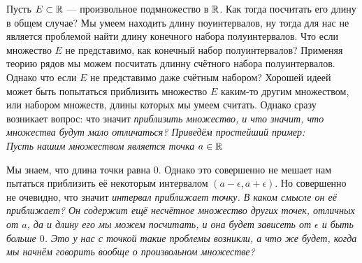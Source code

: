 Пусть $E \subset \mathbb{R}$ --- произвольное подмножество в $\mathbb{R}$. Как тогда посчитать его длину в общем случае?
Мы умеем находить длину поуинтервалов, ну тогда для нас не является проблемой найти длину конечного набора
полуинтервалов. Что если множество $E$ не представимо, как конечный набор полуинтервалов? Применяя теорию рядов
мы можем посчитать длинну счётного набора полуинтервалов. Однако что если $E$ не представимо даже счётным набором?
Хорошей идеей может быть попытаться приблизить множество $E$ каким-то другим множеством, или набором множеств,
длины которых мы умеем считать. Однако сразу возникает вопрос: что значит \it{приблизить множество}, и что
значит, что \it{множества будут мало отличаться}? Приведём простейший пример:\\
Пусть нашим множеством является точка $a \in \mathbb{R}$
\begin{center}
\end{center}
Мы знаем, что длина точки равна $0$. Однако это совершенно не мешает нам пытаться приблизить её некоторым интервалом
$(a - \epsilon, a + \epsilon)$. Но совершенно не очевидно, что значит \it{интервал приближает точку}. В каком смысле
он её \it{приближает}? Он содержит ещё несчётное множество других точек, отличных от $a$, да и длину его мы можем посчитать,
и она будет зависеть от $\epsilon$ и быть больше $0$. Это у нас с точкой такие проблемы возникли, а что же будет,
когда мы начнём говорить вообще о произвольном множестве?

